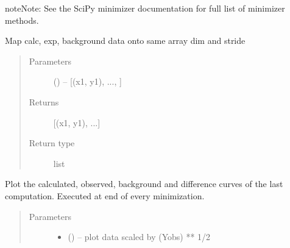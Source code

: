 \documentclass[letterpaper,10pt,english]{sphinxmanual}
\begin{document}
\begin{fulllineitems}
\begin{fulllineitems}
\begin{quote}
\begin{description}
\end{description}\end{quote}

\begin{sphinxadmonition}{note}{Note:}
See the SciPy minimizer documentation for full list of minimizer methods.
\end{sphinxadmonition}

\end{fulllineitems}


\begin{fulllineitems}
\label{\detokenize{rst/refinement:mstack.refinement.Refinement.map_calc_exp_background}}
Map calc, exp, background data onto same array dim and stride
\begin{quote}\begin{description}
\item[{Parameters}] \leavevmode
{} () -- {[}(x1, y1), ..., {]}

\item[{Returns}] \leavevmode
{[}(x1, y1), ...{]}

\item[{Return type}] \leavevmode
list

\end{description}\end{quote}

\end{fulllineitems}


\begin{fulllineitems}
\label{\detokenize{rst/refinement:mstack.refinement.Refinement.plot_min_result}}
Plot the calculated, observed, background and difference curves
of the last computation. Executed at end of every minimization.
\begin{quote}\begin{description}
\item[{Parameters}] \leavevmode\begin{itemize}
\item {} 
 () -- plot data scaled by (Yobs) ** 1/2


\end{itemize}
\end{description}
\end{quote}
\end{fulllineitems}
\end{fulllineitems}
\end{document}
